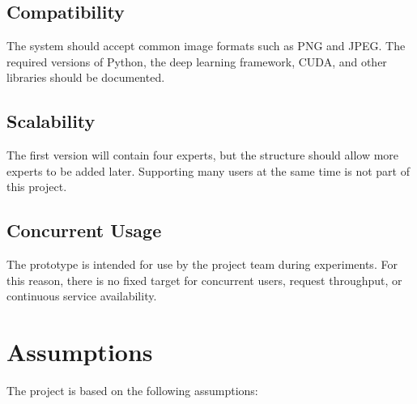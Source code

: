\documentclass{FastFyp}
\begin{document}
\subsection{Compatibility}

The system should accept common image formats such as PNG and JPEG. The required versions of Python, the deep learning framework, CUDA, and other libraries should be documented.

\subsection{Scalability}

The first version will contain four experts, but the structure should allow more experts to be added later. Supporting many users at the same time is not part of this project.

\subsection{Concurrent Usage}

The prototype is intended for use by the project team during experiments. For this reason, there is no fixed target for concurrent users, request throughput, or continuous service availability.

\section{Assumptions}

The project is based on the following assumptions:
\end{document}
